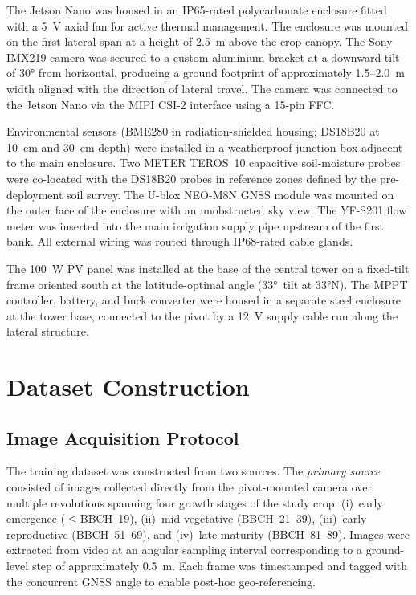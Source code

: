 \documentclass[12pt,a4paper]{report}
\begin{document}
The Jetson Nano was housed in an IP65-rated polycarbonate enclosure fitted with a 5~V axial fan for active thermal management. The enclosure was mounted on the first lateral span at a height of 2.5~m above the crop canopy. The Sony IMX219 camera was secured to a custom aluminium bracket at a downward tilt of 30° from horizontal, producing a ground footprint of approximately 1.5--2.0~m width aligned with the direction of lateral travel. The camera was connected to the Jetson Nano via the MIPI CSI-2 interface using a 15-pin FFC.

Environmental sensors (BME280 in radiation-shielded housing; DS18B20 at 10~cm and 30~cm depth) were installed in a weatherproof junction box adjacent to the main enclosure. Two METER TEROS~10 capacitive soil-moisture probes were co-located with the DS18B20 probes in reference zones defined by the pre-deployment soil survey. The U-blox NEO-M8N GNSS module was mounted on the outer face of the enclosure with an unobstructed sky view. The YF-S201 flow meter was inserted into the main irrigation supply pipe upstream of the first bank. All external wiring was routed through IP68-rated cable glands.

The 100~W PV panel was installed at the base of the central tower on a fixed-tilt frame oriented south at the latitude-optimal angle (33°~tilt at 33°N). The MPPT controller, battery, and buck converter were housed in a separate steel enclosure at the tower base, connected to the pivot by a 12~V supply cable run along the lateral structure.

\section{Dataset Construction}
\label{sec:dataset}

\subsection{Image Acquisition Protocol}

The training dataset was constructed from two sources. The \emph{primary source} consisted of images collected directly from the pivot-mounted camera over multiple revolutions spanning four growth stages of the study crop: (i)~early emergence ($\le$BBCH~19), (ii)~mid-vegetative (BBCH~21--39), (iii)~early reproductive (BBCH~51--69), and (iv)~late maturity (BBCH~81--89). Images were extracted from video at an angular sampling interval corresponding to a ground-level step of approximately 0.5~m. Each frame was timestamped and tagged with the concurrent GNSS angle to enable post-hoc geo-referencing.
\end{document}
